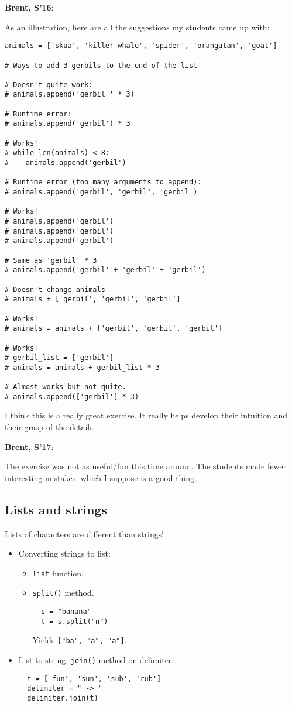 \documentclass{article}
\newenvironment{reflect}[1]
{
  \noindent
  \begin{lrbox}{\reflectbox}
    \begin{minipage}[t]{\textwidth}
      \textbf{#1}:
}{
    \end{minipage}
  \end{lrbox}
  \fbox{\usebox{\reflectbox}}
}
\begin{document}
\begin{reflect}{Brent, S'16}
  As an illustration, here are all the suggestions my students came up
  with:
\begin{verbatim}
animals = ['skua', 'killer whale', 'spider', 'orangutan', 'goat']

# Ways to add 3 gerbils to the end of the list

# Doesn't quite work:
# animals.append('gerbil ' * 3)

# Runtime error:
# animals.append('gerbil') * 3

# Works!
# while len(animals) < 8:
#    animals.append('gerbil')

# Runtime error (too many arguments to append):
# animals.append('gerbil', 'gerbil', 'gerbil')

# Works!
# animals.append('gerbil')
# animals.append('gerbil')
# animals.append('gerbil')

# Same as 'gerbil' * 3
# animals.append('gerbil' + 'gerbil' + 'gerbil')

# Doesn't change animals
# animals + ['gerbil', 'gerbil', 'gerbil']

# Works!
# animals = animals + ['gerbil', 'gerbil', 'gerbil']

# Works!
# gerbil_list = ['gerbil']
# animals = animals + gerbil_list * 3

# Almost works but not quite.
# animals.append(['gerbil'] * 3)
\end{verbatim}

  I think this is a really great exercise. It really helps develop
  their intuition and their grasp of the details.
\end{reflect}

\begin{reflect}{Brent, S'17}
  The exercise was not as useful/fun this time around.  The students
  made fewer interesting mistakes, which I suppose is a good thing.
\end{reflect}

\subsection*{Lists and strings}

Lists of characters are different than strings!

\begin{itemize}
\item Converting strings to list:
  \begin{itemize}
  \item \verb|list| function.
  \item \verb|split()| method.
\begin{verbatim}
  s = "banana"
  t = s.split("n")
\end{verbatim}
Yields \verb|["ba", "a", "a"]|.

  \end{itemize}
\item List to string: \verb|join()| method on delimiter.
\begin{verbatim}
  t = ['fun', 'sun', 'sub', 'rub']
  delimiter = " -> "
  delimiter.join(t)
\end{verbatim}
\end{itemize}
\end{document}
